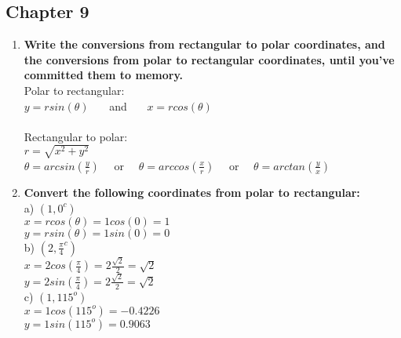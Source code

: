 \clearpage
\subsection{Chapter 9}

\begin{enumerate}

\item{\bf Write the conversions from rectangular to polar coordinates, and the conversions from polar to rectangular coordinates, until you've committed them to memory.}\\

\tab Polar to rectangular:\\

\tab$y = rsin(\theta)$ \ \ \ and \ \ \ $x = rcos(\theta)$\\ \\

\tab Rectangular to polar:\\

\tab$r = \sqrt{x^2 + y^2}$\\

\tab$\theta = arcsin(\frac{y}{r})$ \ \ or \ \ $\theta = arccos(\frac{x}{r})$ \ \ or \ \ $\theta = arctan(\frac{y}{x})$\\

\item{\bf Convert the following coordinates from polar to rectangular:}\\

\tab a) $(1,0^c)$\\

\tab \tab $x = r cos(\theta) = 1 cos(0) = 1$\\

\tab \tab $y = r sin(\theta) = 1 sin(0) = 0$\\

\tab b) $(2,\frac{\pi}{4}^c)$\\

\tab \tab $x = 2 cos(\frac{\pi}{4}) = 2 \frac{\sqrt{2}}{2} = \sqrt{2}$\\

\tab \tab $y = 2 sin(\frac{\pi}{4}) = 2 \frac{\sqrt{2}}{2} = \sqrt{2}$\\

\tab c) $(1,115^o)$\\

\tab \tab $x = 1 cos(115^o) = -0.4226$\\

\tab \tab $y = 1 sin(115^o) = 0.9063$\\


\end{enumerate}
